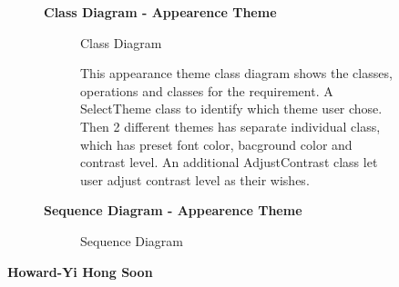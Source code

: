 \documentclass{article}
\begin{document}
		\clearpage

		\begin{figure}[htbp]
			\textbf{Class Diagram - Appearence Theme }
			\centering
			\begin{subfigure}{\textwidth}
				\resizebox{\textwidth}{!}{}
				\caption{Class Diagram}
			\end{subfigure}
			\begin{subfigure}{\textwidth}
				This appearance theme class diagram shows the classes, operations and classes for the requirement. A SelectTheme class to identify
				which theme user chose. Then 2 different themes has separate individual class, which has preset font color, bacground color and 
				contrast level. An additional AdjustContrast class let user adjust contrast level as their wishes.
			\end{subfigure}
		\end{figure}
		\clearpage
		

		\begin{figure}[htbp]
			\textbf{Sequence Diagram - Appearence Theme }
			\centering
			\begin{subfigure}{\textwidth}
				\scalebox{0.6}{}
				\caption{Sequence Diagram}
			\end{subfigure}
			\begin{subfigure}{\textwidth}
			\end{subfigure}
		\end{figure}
		\clearpage

		\textbf{Howard-Yi Hong Soon}
\end{document}
